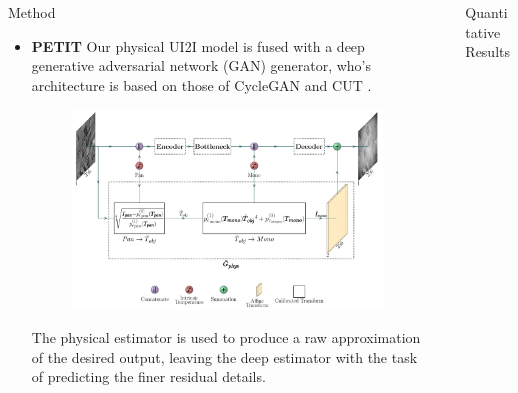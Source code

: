 \documentclass[final]{beamer}
\newlength{\sepwidth}
\newlength{\colwidth}
\newcommand{\separatorcolumn}{\begin{column}{\sepwidth}\end{column}}
\begin{document}
\begin{frame}[t]
\begin{columns}[t]
\begin{column}{\colwidth}
\begin{alertblock}{Method}
\begin{itemize}
      \item \textbf{PETIT}\linebreak\linebreak
        Our physical UI2I model is fused with a deep generative adversarial network (GAN) generator, who's architecture is based on those of CycleGAN \cite{CycleGAN2017} and CUT \cite{park2020cut}.
        \begin{figure}
          \centering
          \includegraphics[width=\linewidth]{../figs/network/src/petit.pdf}
        \end{figure}  
        The physical estimator is used to produce a raw approximation of the desired output, leaving the deep estimator with the task of predicting the finer residual details.
    
    \end{itemize}
  
  \end{alertblock}

\end{column}

\separatorcolumn


\begin{column}{\colwidth}

  \begin{block}{Quantitative Results}


\end{block}
\end{column}
\end{columns}
\end{frame}
\end{document}
